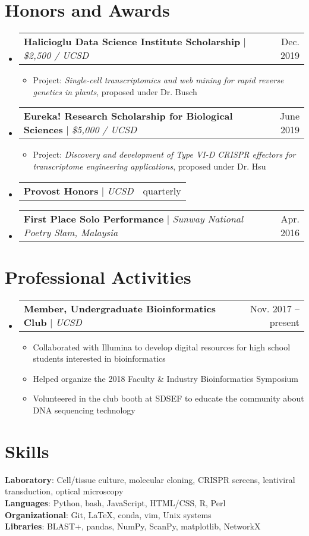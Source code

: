 \documentclass[letterpaper,11pt]{article}
\makeatletter
\newcommand{\resumeItem}[1]{
  \item\small{
    {#1 \vspace{-2pt}}
  }
}
\newcommand{\resumeProjectHeading}[2]{
    \item
    \begin{tabular*}{0.97\textwidth}{l@{\extracolsep{\fill}}r}
      \small#1 & #2 \\
    \end{tabular*}\vspace{-7pt}
}
\newcommand{\resumeSubHeadingListStart}{\begin{itemize}[leftmargin=0.15in, label={}]}
\newcommand{\resumeSubHeadingListEnd}{\end{itemize}}
\newcommand{\resumeItemListStart}{\begin{itemize}}
\newcommand{\resumeItemListEnd}{\end{itemize}\vspace{-5pt}}
\makeatother
\begin{document}
\section{Honors and Awards}
    \resumeSubHeadingListStart
      \resumeProjectHeading
          {\textbf{Halicioglu Data Science Institute Scholarship} $|$ \emph{\$2,500 / UCSD}}{Dec. 2019}
          \resumeItemListStart
            \resumeItem{Project: \emph{Single-cell transcriptomics and web mining for rapid reverse genetics in plants}, proposed under Dr. Busch}
          \resumeItemListEnd
       \resumeProjectHeading
          {\textbf{Eureka! Research Scholarship for Biological Sciences} $|$ \emph{\$5,000 / UCSD}}{June 2019}
          \resumeItemListStart
            \resumeItem{Project: \emph{Discovery and development of Type VI-D CRISPR effectors for transcriptome engineering applications}, proposed under Dr. Hsu}
          \resumeItemListEnd
       \resumeProjectHeading
          {\textbf{Provost Honors} $|$ \emph{UCSD}}{quarterly}
       \resumeProjectHeading
          {\textbf{First Place Solo Performance} $|$ \emph{Sunway National Poetry Slam, Malaysia}}{Apr. 2016}
    \resumeSubHeadingListEnd

\section{Professional Activities}
  \resumeSubHeadingListStart
    \resumeProjectHeading
      {\textbf{Member, Undergraduate Bioinformatics Club} $|$ \emph{UCSD}}{Nov. 2017 -- present}
      {}{}
      \resumeItemListStart
        \resumeItem{Collaborated with Illumina to develop digital resources for high school students interested in bioinformatics}
        \resumeItem{Helped organize the 2018 Faculty \& Industry Bioinformatics Symposium}
        \resumeItem{Volunteered in the club booth at SDSEF to educate the community about DNA sequencing technology}
      \resumeItemListEnd
  \resumeSubHeadingListEnd

\section{Skills}
 \begin{itemize}[leftmargin=0.15in, label={}]
    \small{\item{
     \textbf{Laboratory}{: Cell/tissue culture, molecular cloning, CRISPR screens, lentiviral transduction, optical microscopy} \\
     \textbf{Languages}{: Python, bash, JavaScript, HTML/CSS, R, Perl} \\
     \textbf{Organizational}{: Git, \LaTeX, conda, vim, Unix systems} \\
     \textbf{Libraries}{: BLAST+, pandas, NumPy, ScanPy, matplotlib, NetworkX} \\}}
 \end{itemize}


\end{document}
